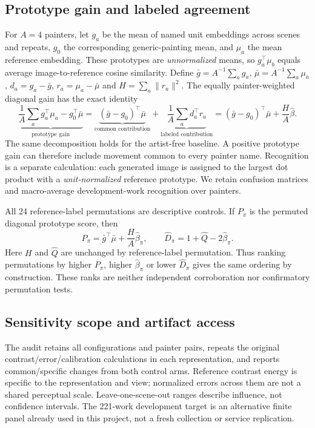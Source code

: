 \subsection{Prototype gain and labeled agreement}
For $A=4$ painters, let $g_a$ be the mean of named unit embeddings across scenes
and repeats, $g_0$ the corresponding generic-painting mean, and $\mu_a$ the mean
reference embedding. These prototypes are \emph{unnormalized} means, so
$g_a^\top\mu_b$ equals average image-to-reference cosine similarity. Define
$\bar g=A^{-1}\sum_a g_a$, $\bar\mu=A^{-1}\sum_a\mu_a$,
$d_a=g_a-\bar g$, $r_a=\mu_a-\bar\mu$ and $H=\sum_a\|r_a\|^2$.
The equally painter-weighted diagonal gain has the exact identity
\begin{equation}
\underbrace{\frac1A\sum_a g_a^\top\mu_a-g_0^\top\bar\mu}_{\text{prototype gain}}
=\underbrace{(\bar g-g_0)^\top\bar\mu}_{\text{common contribution}}
+\underbrace{\frac1A\sum_a d_a^\top r_a}_{\text{labeled contribution}}
=(\bar g-g_0)^\top\bar\mu+\frac{H}{A}\widehat\beta.
\label{eq:learned-prototype-gain}
\end{equation}
The same decomposition holds for the artist-free baseline. A positive prototype
gain can therefore include movement common to every painter name. Recognition
is a separate calculation: each generated image is assigned to the largest dot
product with a \emph{unit-normalized} reference prototype. We retain confusion
matrices and macro-average development-work recognition over painters.

All 24 reference-label permutations are descriptive controls. If $P_\pi$ is the
permuted diagonal prototype score, then
\begin{equation}
P_\pi=\bar g^\top\bar\mu+\frac{H}{A}\widehat\beta_\pi,
\qquad
\widehat D_\pi=1+\widehat Q-2\widehat\beta_\pi.
\label{eq:learned-permutation}
\end{equation}
Here $H$ and $\widehat Q$ are unchanged by reference-label permutation. Thus
ranking permutations by higher $P_\pi$, higher $\widehat\beta_\pi$ or lower
$\widehat D_\pi$ gives the same ordering by construction. These ranks are
neither independent corroboration nor confirmatory permutation tests.

\subsection{Sensitivity scope and artifact access}
The audit retains all configurations and painter pairs, repeats the original
contrast/error/calibration calculations in each representation, and reports
common/specific changes from both control arms. Reference contrast energy is
specific to the representation and view; normalized errors across them are not
a shared perceptual scale. Leave-one-scene-out ranges describe influence, not
confidence intervals. The 221-work development target is an alternative finite
panel already used in this project, not a fresh collection or service replication.

